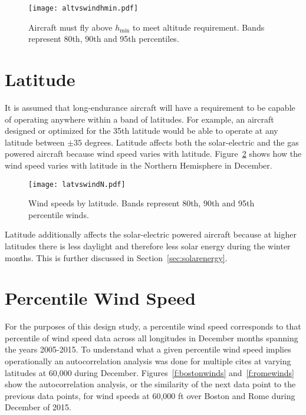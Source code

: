 \begin{figure}[h!]
	\begin{center}
	\texttt{[image: altvswindhmin.pdf]}
    \caption{Aircraft must fly above $h_{\text{min}}$ to meet altitude requirement. Bands represent 80th, 90th and 95th percentiles.\cite{wind}}
	\label{f:altvswindhmin}
	\end{center}
\end{figure}


\section{Latitude}

It is assumed that long-endurance aircraft will have a requirement to be capable of operating anywhere within a band of latitudes.  
For example, an aircraft designed or optimized for the 35th latitude would be able to operate at any latitude between $\pm35$ degrees. 
Latitude affects both the solar-electric and the gas powered aircraft because wind speed varies with latitude. 
Figure~\ref{f:latvswind} shows how the wind speed varies with latitude in the Northern Hemisphere in December. 

\begin{figure}[h!]
	\begin{center}
	\texttt{[image: latvswindN.pdf]}
    \caption{Wind speeds by latitude.  Bands represent 80th, 90th and 95th percentile winds.\cite{wind}}
	\label{f:latvswind}
	\end{center}
\end{figure}

Latitude additionally affects the solar-electric powered aircraft because at higher latitudes there is less daylight and therefore less solar energy during the winter months. This is further discussed in Section~\ref{sec:solarenergy}.

\section{Percentile Wind Speed}

For the purposes of this design study, a percentile wind speed corresponds to that percentile of wind speed data across all longitudes in December months spanning the years 2005-2015.  
To understand what a given percentile wind speed implies operationally an autocorrelation analysis was done for multiple cites at varying latitudes at 60,000 during December. 
Figures~\ref{f:bostonwinds} and~\ref{f:romewinds} show the autocorrelation analysis, or the similarity of the next data point to the previous data points, for wind speeds at 60,000 ft over Boston and Rome during December of 2015. 

